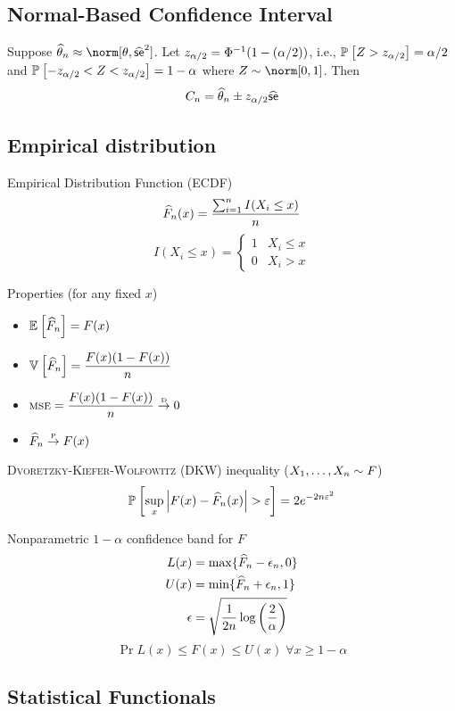 \documentclass[landscape]{article}
\begin{document}
\begin{multicols*}{2}
\subsection{Normal-Based Confidence Interval}

Suppose $\that_n \approx \norm[\theta,\sehat^2]$.
Let $z_{\alpha/2} = \Phi^{-1}(1-(\alpha/2))$,
i.e., $\mathbb{P}_{}\left[Z > z_{\alpha/2}\right] = \alpha/2$ and $\mathbb{P}_{}\left[-z_{\alpha/2} < Z < z_{\alpha/2}\right] = 1-\alpha$
where $Z\dist\norm[0,1]$.
Then \[C_n = \widehat{\theta}_n \pm z_{\alpha/2}\widehat{\textsf{se}}\]

\subsection{Empirical distribution}

Empirical Distribution Function (ECDF)
\[\widehat{F}_n(x) = \displaystyle\frac{\sum_{i=1}^n I(X_i \le x)}{n}\]
\[I(X_i \le x) = \begin{cases}
  1 & X_i \le x \\
  0 & X_i > x
\end{cases}\]

Properties (for any fixed $x$)
\begin{itemize}
  \item $\mathbb{E}_{}\left[\widehat{F}_n\right] = F(x)$
  \item $\mathbb{V}_{}\left[\widehat{F}_n\right] = \displaystyle\frac{F(x)(1-F(x))}{n}$
  \item $\textsc{mse} = \displaystyle\frac{F(x)(1-F(x))}{n} \stackrel{\text{\tiny{D}}}{\rightarrow} 0$
  \item $\widehat{F}_n \stackrel{\text{\tiny{P}}}{\rightarrow} F(x)$
\end{itemize}

\textsc{Dvoretzky-Kiefer-Wolfowitz} (DKW) inequality ($X_1,\dots,X_n\sim F$)
\[\mathbb{P}_{}\left[\sup_x\left|F(x)-\widehat{F}_n(x)\right| > \varepsilon\right] =
  2e^{-2n\varepsilon^2}\]

Nonparametric $1-\alpha$ confidence band for $F$
\begin{align*}
  L(x) &= \max\{\widehat{F}_n-\epsilon_n, 0\} \\
  U(x) &= \min\{\widehat{F}_n+\epsilon_n, 1\} \\
  \epsilon &=
    \sqrt{\displaystyle\frac{1}{2n}\log\left( \frac{2}{\alpha} \right)} \\
\end{align*}
\[\Pr{L(x) \le F(x) \le U(x) \;\forall x} \ge 1-\alpha\]

\subsection{Statistical Functionals}


\end{multicols*}
\end{document}
